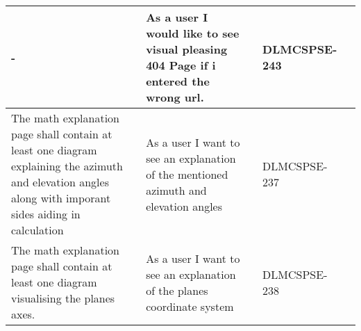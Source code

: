 \begin{xltabular}{\textwidth}{|X|X|M{1.8cm}|M{1.3cm}|M{1.3cm}|}
  - & As a user I would like to see visual pleasing 404 Page if i entered the wrong url. &  & {\color{purpleT}\ttfamily DLMCSPSE-243} &  \\ \hline 
  The math explanation page shall contain at least one diagram explaining the azimuth and elevation angles along with imporant sides aiding in calculation & As a user I want to see an explanation of the mentioned azimuth and elevation angles &  & {\color{purpleT}\ttfamily DLMCSPSE-237} &  \\ \hline 
  The math explanation page shall contain at least one diagram visualising the planes axes. & As a user I want to see an explanation of the planes coordinate system &  & {\color{purpleT}\ttfamily DLMCSPSE-238} &  \\ \hline 
  
\end{xltabular} 
 \egroup 
 \color{default}